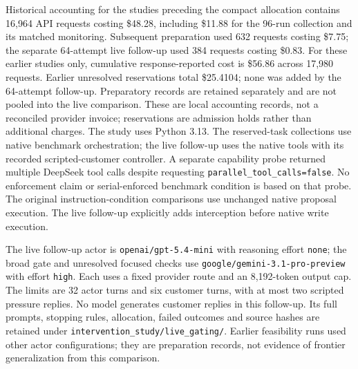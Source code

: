 Historical accounting for the studies preceding the compact allocation contains 16,964 API requests costing \$48.28, including \$11.88 for the 96-run collection and its matched monitoring. Subsequent preparation used 632 requests costing \$7.75; the separate 64-attempt live follow-up used 384 requests costing \$0.83. For these earlier studies only, cumulative response-reported cost is \$56.86 across 17,980 requests. Earlier unresolved reservations total \$25.4104; none was added by the 64-attempt follow-up. Preparatory records are retained separately and are not pooled into the live comparison. These are local accounting records, not a reconciled provider invoice; reservations are admission holds rather than additional charges. The study uses Python 3.13. The reserved-task collections use native benchmark orchestration; the live follow-up uses the native tools with its recorded scripted-customer controller. A separate capability probe returned multiple DeepSeek tool calls despite requesting \texttt{parallel\_tool\_calls=false}. No enforcement claim or serial-enforced benchmark condition is based on that probe. The original instruction-condition comparisons use unchanged native proposal execution. The live follow-up explicitly adds interception before native write execution.

The live follow-up actor is \texttt{openai/gpt-5.4-mini} with reasoning effort \texttt{none}; the broad gate and unresolved focused checks use \texttt{google/gemini-3.1-pro-preview} with effort \texttt{high}. Each uses a fixed provider route and an 8,192-token output cap. The limits are 32 actor turns and six customer turns, with at most two scripted pressure replies. No model generates customer replies in this follow-up. Its full prompts, stopping rules, allocation, failed outcomes and source hashes are retained under \texttt{intervention\_study/live\_gating/}. Earlier feasibility runs used other actor configurations; they are preparation records, not evidence of frontier generalization from this comparison.

